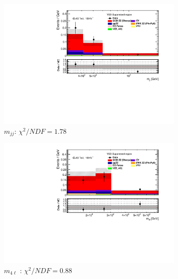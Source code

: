 \begin{figure}[!htb]
    \centering
    \begin{subfigure}{.49\textwidth}
        \centering
        \includegraphics[width=.98\linewidth]{figures/Results/RecoDist_VBSSuppressed/reco_mjj_CR.pdf}
        \caption{ \footnotesize{$m_{jj}$}: $\chi^2/NDF = 1.78$ }
    \end{subfigure}
    \begin{subfigure}{.49\textwidth}
        \centering
        \includegraphics[width=.98\linewidth]{figures/Results/RecoDist_VBSSuppressed/reco_m4l_CR.pdf}
        \caption{ \footnotesize{$m_{4\ell}$ }: $\chi^2/NDF = 0.88$ }
    \end{subfigure}\\
    \begin{subfigure}{.49\textwidth}
        \centering

\end{subfigure}
\end{figure}
